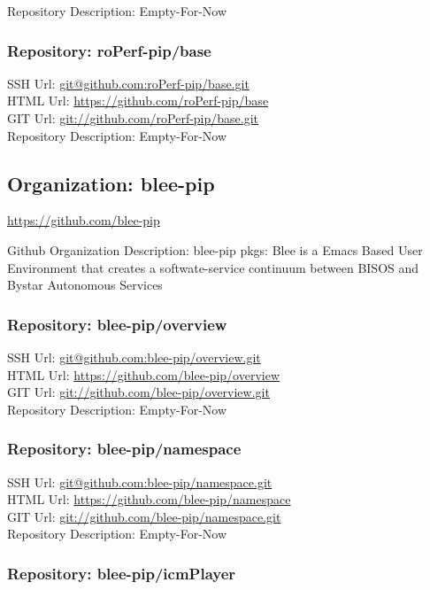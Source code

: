 Repository Description: Empty-For-Now

\subsubsection{Repository: roPerf-pip/base}

SSH Url:  \url{git@github.com:roPerf-pip/base.git}\\
HTML Url: \url{https://github.com/roPerf-pip/base}\\
GIT Url:  \url{git://github.com/roPerf-pip/base.git}\\


Repository Description: Empty-For-Now

\subsection{Organization: blee-pip}

\url{https://github.com/blee-pip}

Github Organization Description: blee-pip  pkgs:  Blee is a Emacs Based User Environment that creates a softwate-service continuum between BISOS and Bystar Autonomous Services

\subsubsection{Repository: blee-pip/overview}

SSH Url:  \url{git@github.com:blee-pip/overview.git}\\
HTML Url: \url{https://github.com/blee-pip/overview}\\
GIT Url:  \url{git://github.com/blee-pip/overview.git}\\


Repository Description: Empty-For-Now

\subsubsection{Repository: blee-pip/namespace}

SSH Url:  \url{git@github.com:blee-pip/namespace.git}\\
HTML Url: \url{https://github.com/blee-pip/namespace}\\
GIT Url:  \url{git://github.com/blee-pip/namespace.git}\\


Repository Description: Empty-For-Now

\subsubsection{Repository: blee-pip/icmPlayer}

